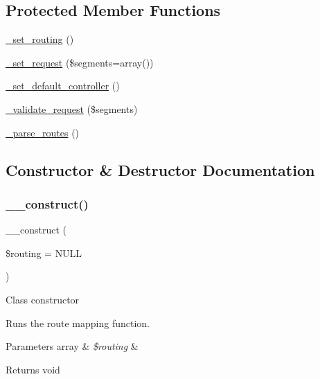 \subsection*{Protected Member Functions}
\begin{DoxyCompactItemize}
\item 
\mbox{\hyperlink{class_c_i___router_abc9f3e0d48cec66f93a7f103c9a65892}{\+\_\+set\+\_\+routing}} ()
\item 
\mbox{\hyperlink{class_c_i___router_a92b8b486926e4dea5fee4d71f80a472a}{\+\_\+set\+\_\+request}} (\$segments=array())
\item 
\mbox{\hyperlink{class_c_i___router_a86b13067b062022251d2c7ecb4fb9492}{\+\_\+set\+\_\+default\+\_\+controller}} ()
\item 
\mbox{\hyperlink{class_c_i___router_a488aa4aaa52c36c4e6c791e7bfd76358}{\+\_\+validate\+\_\+request}} (\$segments)
\item 
\mbox{\hyperlink{class_c_i___router_a55a42fae865d03334b49baa5a5a6bd0b}{\+\_\+parse\+\_\+routes}} ()
\end{DoxyCompactItemize}


\subsection{Constructor \& Destructor Documentation}
\mbox{\label{class_c_i___router_a9b81050c9907794a374f5088743a0252}} 
\subsubsection{\texorpdfstring{\+\_\+\+\_\+construct()}{\_\_construct()}}
{\footnotesize\ttfamily \+\_\+\+\_\+construct (\begin{DoxyParamCaption}\item[{}]{\$routing = {\ttfamily NULL} }\end{DoxyParamCaption})}

Class constructor

Runs the route mapping function.


\begin{DoxyParams}[1]{Parameters}
array & {\em \$routing} & \\
\hline
\end{DoxyParams}
\begin{DoxyReturn}{Returns}
void 
\end{DoxyReturn}


